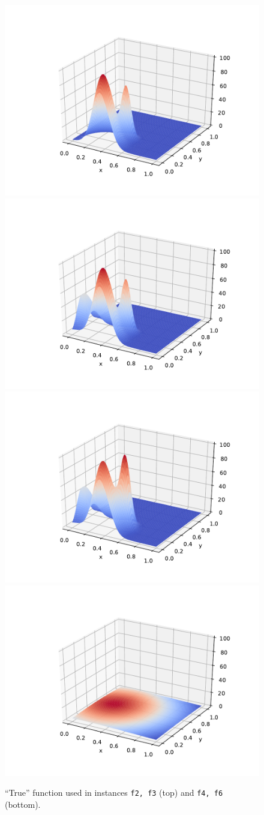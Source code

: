 \documentclass[smallextended]{svjour3}
\begin{document}
\begin{figure}[!htbp]
  \centering
  \includegraphics[width=.33\textwidth,trim=100 30 50 50,clip=True]{f2.pdf}
  \includegraphics[width=.33\textwidth,trim=100 30 50 50,clip=True]{f3.pdf} 
  \includegraphics[width=.33\textwidth,trim=100 30 50 50,clip=True]{f4.pdf} 
  \includegraphics[width=.33\textwidth,trim=100 30 50 50,clip=True]{f6.pdf}
  \caption{``True'' function used in instances \texttt{f2, f3} (top) and \texttt{f4, f6} (bottom).}
  \label{fig:fA}
\end{figure}
 
\end{document}

